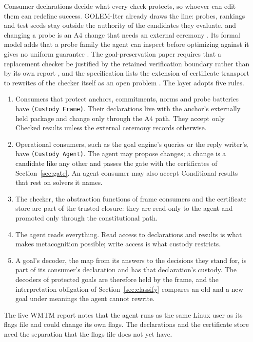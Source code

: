 \documentclass[11pt]{article}
\newcommand{\code}[1]{\texttt{#1}}
\theoremstyle{definition}
\theoremstyle{plain}
\begin{document}
Consumer declarations decide what every check protects, so whoever can edit them can redefine
success. GOLEM-Iter already draws the line: probes, rankings and test seeds stay outside the
authority of the candidates they evaluate, and changing a probe is an A4 change that needs an
external ceremony \cite{golemspec}. Its formal model adds that a probe family the agent can inspect
before optimizing against it gives no uniform guarantee \cite{golemformal}. The goal-preservation
paper requires that a replacement checker be justified by the retained verification boundary
rather than by its own report \cite{goalpres}, and the specification lists the extension of
certificate transport to rewrites of the checker itself as an open problem
\cite[Section~16.5]{spec}. The layer adopts five rules.
\begin{enumerate}
\item Consumers that protect anchors, commitments, norms and probe batteries have
  \code{(Custody Frame)}. Their declarations live with the anchor's externally held package and
  change only through the A4 path. They accept only Checked results unless the external ceremony
  records otherwise.
\item Operational consumers, such as the goal engine's queries or the reply writer's, have
  \code{(Custody Agent)}. The agent may propose changes; a change is a candidate like any other and
  passes the gate with the certificates of Section~\ref{sec:gate}. An agent consumer may also
  accept Conditional results that rest on solvers it names.
\item The checker, the abstraction functions of frame consumers and the certificate store are part
  of the trusted closure: they are read-only to the agent and promoted only through the
  constitutional path.
\item The agent reads everything. Read access to declarations and results is what makes
  metacognition possible; write access is what custody restricts.
\item A goal's decoder, the map from its answers to the decisions they stand for, is part of its
  consumer's declaration and has that declaration's custody. The decoders of protected goals are
  therefore held by the frame, and the interpretation obligation of Section~\ref{sec:classify}
  compares an old and a new goal under meanings the agent cannot rewrite.
\end{enumerate}
The live WMTM report notes that the agent runs as the same Linux user as its flags file and could
change its own flags. The declarations and the certificate store need the separation that the flags
file does not yet have.
\end{document}
